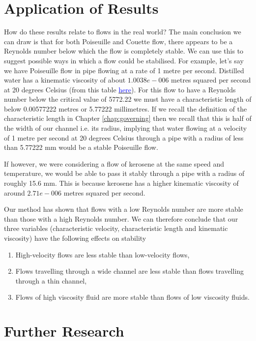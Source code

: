 \section{Application of Results}

How do these results relate to flows in the real world? The main conclusion we can draw is that for both Poiseuille and Couette flow, there appears to be a Reynolds number below which the flow is completely stable. We can use this to suggest possible ways in which a flow could be stabilised. For example, let's say we have Poiseuille flow in pipe flowing at a rate of 1 metre per second. Distilled water has a kinematic viscosity of about $ 1.0038e-006 $ metres squared per second at 20 degrees Celsius (from this table \href{https://www.engineersedge.com/fluid_flow/kinematic-viscosity-table.htm}{\textcolor{blue}{here}}). For this flow to have a Reynolds number below the critical value of 5772.22 we must have a characteristic length of below 0.00577222 metres or 5.77222 millimetres. If we recall the definition of the characteristic length in Chapter \ref{chap:governing} then we recall that this is half of the width of our channel i.e. its radius, implying that water flowing at a velocity of 1 metre per second at 20 degrees Celsius through a pipe with a radius of less than 5.77222 mm would be a stable Poiseuille flow.

If however, we were considering a flow of kerosene at the same speed and temperature, we would be able to pass it stably through a pipe with a radius of roughly 15.6 mm. This is because kerosene has a higher kinematic viscosity of around $2.71e-006$ metres squared per second.

Our method has shown that flows with a low Reynolds number are more stable than those with a high Reynolds number. We can therefore conclude that our three variables (characteristic velocity, characteristic length and kinematic viscosity) have the following effects on stability
\begin{enumerate}
    \item High-velocity flows are less stable than low-velocity flows,
    \item Flows travelling through a wide channel are less stable than flows travelling through a thin channel,
    \item Flows of high viscosity fluid are more stable than flows of low viscosity fluids.
\end{enumerate}

\section{Further Research}

